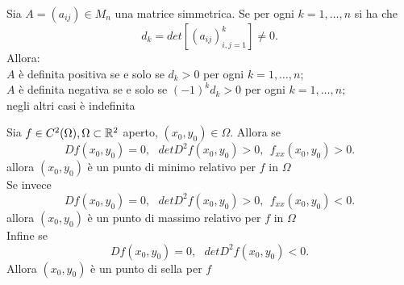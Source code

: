 \documentclass[12px]{article}
\begin{document}
	\begin{teo}
		Sia $A = (a_{ij})\in M_n$ una matrice simmetrica. Se per ogni  $k =1,\ldots, n$ si ha che
		 \[
			 d_k = det[(a_{ij})^k_{i,j=1}]\neq 0
		.\] 
		Allora:\\
		 $A$ è definita positiva se e solo se $d_k > 0$ per ogni $k=1,\ldots, n;$ \\
		 $A$ è definita negativa se e solo se $(-1)^kd_k > 0$ per ogni $k=1,\ldots, n;$ \\
		 negli altri casi è indefinita
	\end{teo}
	\begin{teo}
		Sia $f\in C^2(\Omega),\Omega \subset\mathbb{R}^2$ aperto,  $(x_0,y_0)\in\Omega$. Allora se
		\[
			Df(x_0,y_0) = 0, \ \ \ detD^2 f(x_0,y_0) > 0, \ \ f_{xx}(x_0,y_0)>0
		.\] 
		allora $(x_0,y_0)$ è un punto di minimo relativo per $f$ in $\Omega$ \\
		Se invece
		\[
			Df(x_0,y_0) = 0, \ \ \ detD^2 f(x_0,y_0) > 0, \ \ f_{xx}(x_0,y_0)<0
		.\] 
		allora $(x_0,y_0)$ è un punto di massimo relativo per $f$ in $\Omega$\\
		Infine se 
		\[
			Df(x_0,y_0) = 0, \ \ \ detD^2 f(x_0,y_0) < 0
		.\] 
		Allora  $(x_0,y_0)$ è un punto di sella per $f$
	\end{teo}
\end{document}
